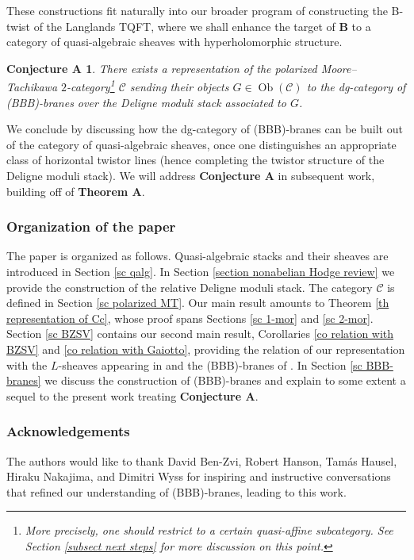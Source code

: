 \documentclass[11pt, a4paper]{amsart}
\numberwithin{equation}{section}
\newtheorem*{conjecture_A}{Conjecture A}
\theoremstyle{definition}
\theoremstyle{remark}
\DeclareMathOperator{\Ob}{Ob}
\newcommand{\Cc}{\mathcal{C}}
\newcommand{\bB}{\mathbf{B}}
\begin{document}
These constructions fit naturally into our broader program of constructing the B-twist of the Langlands TQFT, where we shall enhance the target of $\bB$ to a category of quasi-algebraic sheaves with hyperholomorphic structure.

\begin{conjecture_A}
There exists a representation of the polarized Moore--Tachikawa $2$-category\footnote{More precisely, one should restrict to a certain quasi-affine subcategory. See Section \ref{subsect next steps} for more discussion on this point.} $\Cc$ sending their objects $G \in \Ob(\Cc)$ to the dg-category of (BBB)-branes over the Deligne moduli stack associated to $G$. 
\end{conjecture_A}

We conclude by discussing how the dg-category of (BBB)-branes can be built out of the category of quasi-algebraic sheaves, once one distinguishes an appropriate class of horizontal twistor lines (hence completing the twistor structure of the Deligne moduli stack). We will address {\bf Conjecture A} in subsequent work, building off of {\bf Theorem A}.



\subsubsection*{Organization of the paper}

The paper is organized as follows. Quasi-algebraic stacks and their sheaves are introduced in Section \ref{sc qalg}. In Section \ref{section nonabelian Hodge review} we provide the construction of the relative Deligne moduli stack. The category $\Cc$ is defined in Section \ref{sc polarized MT}. Our main result amounts to Theorem \ref{th representation of Cc}, whose proof spans Sections \ref{sc 1-mor} and \ref{sc 2-mor}. Section \ref{sc BZSV} contains our second main result, Corollaries \ref{co relation with BZSV} and \ref{co relation with Gaiotto}, providing the relation of our representation with the $L$-sheaves appearing in \cite{BZSV} and the (BBB)-branes of \cite{Gaiotto}. In Section \ref{sc BBB-branes} we discuss the construction of (BBB)-branes and explain to some extent a sequel to the present work treating {\bf Conjecture A}.





 

\subsubsection*{Acknowledgements}
The authors would like to thank David Ben-Zvi, Robert Hanson, Tamás Hausel, Hiraku Nakajima, and Dimitri Wyss for inspiring and instructive conversations that refined our understanding of (BBB)-branes, leading to this work. %
\end{document}
